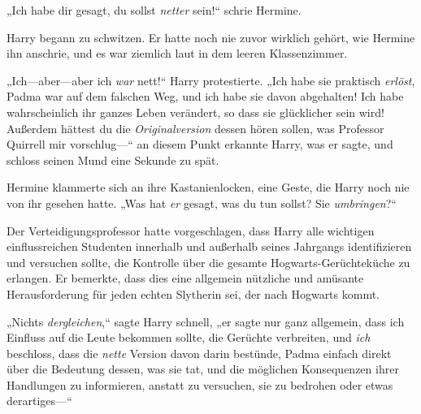 

„Ich habe dir gesagt, du sollst \emph{netter} sein!“ schrie Hermine.

Harry begann zu schwitzen. Er hatte noch nie zuvor wirklich gehört, wie Hermine ihn anschrie, und es war ziemlich laut in dem leeren Klassenzimmer.

„Ich—aber—aber ich \emph{war} nett!“ Harry protestierte. „Ich habe sie praktisch \emph{erlöst}, Padma war auf dem falschen Weg, und ich habe sie davon abgehalten! Ich habe wahrscheinlich ihr ganzes Leben verändert, so dass sie glücklicher sein wird! Außerdem hättest du die \emph{Originalversion} dessen hören sollen, was Professor Quirrell mir vorschlug—“ an diesem Punkt erkannte Harry, was er sagte, und schloss seinen Mund eine Sekunde zu spät.

Hermine klammerte sich an ihre Kastanienlocken, eine Geste, die Harry noch nie von ihr gesehen hatte. „Was hat \emph{er} gesagt, was du tun sollst? Sie \emph{umbringen}?“

Der Verteidigungsprofessor hatte vorgeschlagen, dass Harry alle wichtigen einflussreichen Studenten innerhalb und außerhalb seines Jahrgangs identifizieren und versuchen sollte, die Kontrolle über die gesamte Hogwarts-Gerüchteküche zu erlangen. Er bemerkte, dass dies eine allgemein nützliche und amüsante Herausforderung für jeden echten Slytherin sei, der nach Hogwarts kommt.

„Nichts \emph{dergleichen},“ sagte Harry schnell, „er sagte nur ganz allgemein, dass ich Einfluss auf die Leute bekommen sollte, die Gerüchte verbreiten, und \emph{ich} beschloss, dass die \emph{nette} Version davon darin bestünde, Padma einfach direkt über die Bedeutung dessen, was sie tat, und die möglichen Konsequenzen ihrer Handlungen zu informieren, anstatt zu versuchen, sie zu bedrohen oder etwas derartiges—“

